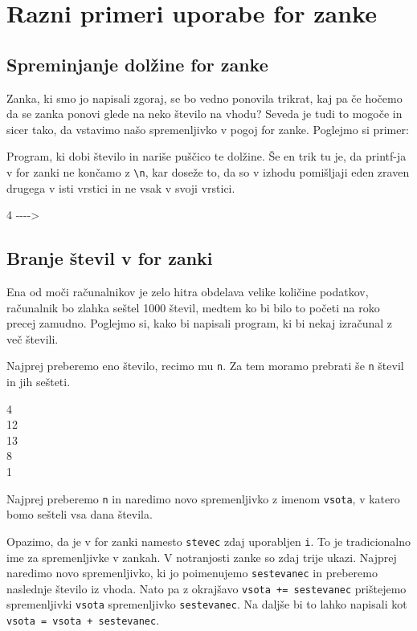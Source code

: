 \documentclass{book}
\begin{document}
\section{Razni primeri uporabe for zanke}

\subsection{Spreminjanje dolžine for zanke}
Zanka, ki smo jo napisali zgoraj, se bo vedno ponovila trikrat,
kaj pa če hočemo da se zanka ponovi glede na neko število na vhodu?
Seveda je tudi to mogoče in sicer tako, da vstavimo našo spremenljivko v pogoj
for zanke. Poglejmo si primer:

\begin{examples}
Program, ki dobi število in nariše puščico te dolžine.
Še en trik tu je, da printf-ja v for zanki ne končamo z \verb+\n+, kar doseže
to, da so v izhodu pomišljaji eden zraven drugega v isti vrstici in ne
vsak v svoji vrstici.


\begin{inout}
	4
	\tcblower
	-{}-{}-{}->
\end{inout}

\end{examples}

\subsection{Branje števil v for zanki}

Ena od moči računalnikov je zelo hitra obdelava velike količine podatkov,
računalnik bo zlahka seštel 1000 števil, medtem ko bi bilo to početi na roko
precej zamudno. Poglejmo si, kako bi napisali program, ki bi nekaj izračunal z
več števili.

\begin{examples}
Najprej preberemo eno število, recimo mu \verb+n+.
Za tem moramo prebrati še \verb+n+ števil in jih sešteti.


\begin{inout}
	4  \\
	12 \\
	13 \\
	8  \\
	1
\end{inout}

Najprej preberemo \verb+n+ in naredimo novo spremenljivko z imenom \verb+vsota+,
v katero bomo sešteli vsa dana števila.

Opazimo, da je v for zanki namesto \verb+stevec+ zdaj uporabljen \verb+i+.
To je tradicionalno ime za spremenljivke v zankah.
V notranjosti zanke so zdaj trije ukazi. Najprej naredimo novo
spremenljivko, ki jo poimenujemo \verb+sestevanec+ in preberemo naslednje
število iz vhoda. Nato pa z okrajšavo \verb-vsota += sestevanec- prištejemo
spremenljivki \verb+vsota+ spremenljivko \verb+sestevanec+.
Na daljše bi to lahko napisali kot \verb-vsota = vsota + sestevanec-.

\end{examples}
\end{document}
